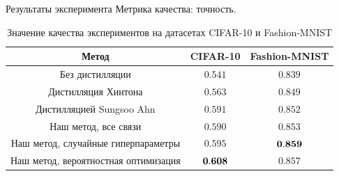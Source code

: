 \documentclass{beamer}
\begin{document}

\begin{frame}{Результаты эксперимента}
    Метрика качества: точность. \\

    \begin{table}[h!]
        \centering
        \begin{adjustbox}{max width=\textwidth}
            \begin{tabular}{|c|c|c|}
                \hline
                Метод                                & CIFAR-10       & Fashion-MNIST  \\
                \hline \hline
                Без дистилляции                      & $0.541$        & $0.839$        \\ \hline
                Дистилляция Хинтона                  & $0.563$        & $0.849$        \\ \hline
                Дистилляцией Sungsoo Ahn             & $0.591$        & $0.852$        \\ \hline
                Наш метод, все связи                 & $0.590$        & $0.853$        \\ \hline
                Наш метод, случайные гиперпараметры  & $0.595$        & $\bold{0.859}$ \\ \hline
                Наш метод, вероятностная оптимизация & $\bold{0.608}$ & $0.857$        \\ \hline
            \end{tabular}
        \end{adjustbox}
        \caption*{Значение качества экспериментов на датасетах CIFAR-10 и Fashion-MNIST}
        \label{table:result_accuracy}
    \end{table}
\end{frame}

\end{document}
